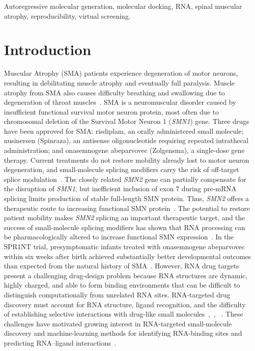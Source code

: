 \documentclass[journal]{IEEEtran}
\begin{document}
\begin{IEEEkeywords}
Autoregressive molecular generation, molecular docking, RNA, spinal
muscular atrophy, reproducibility, virtual screening.
\end{IEEEkeywords}

\section{Introduction}
 Muscular Atrophy (SMA) patients experience
degeneration of motor neurons, resulting in debilitating muscle atrophy
and eventually full paralysis. Muscle atrophy from SMA also causes
difficulty breathing and swallowing due to degeneration of throat
muscles~\cite{aslesh2022}. SMA is a neuromuscular disorder caused by
insufficient functional survival motor neuron protein, most often due to
chromosomal deletion of the Survival Motor Neuron 1 (\textit{SMN1})
gene. Three drugs have been approved for SMA: risdiplam, an orally
administered small molecule; nusinersen (Spinraza), an antisense
oligonucleotide requiring repeated intrathecal administration; and
onasemnogene abeparvovec (Zolgensma), a single-dose gene therapy.
Current treatments do not restore mobility already lost to motor neuron
degeneration, and small-molecule splicing modifiers carry the risk of
off-target splice modulation~\cite{aslesh2022}. The
closely related \textit{SMN2} gene can partially compensate for the
disruption of \textit{SMN1}, but inefficient inclusion of exon 7 during
pre-mRNA splicing limits production of stable full-length SMN protein.
Thus, \textit{SMN2} offers a therapeutic route to increasing functional
SMN protein~\cite{aslesh2022}. The potential to restore patient mobility
makes \textit{SMN2} splicing an important therapeutic target, and the
success of small-molecule splicing modifiers has shown that RNA
processing can be pharmacologically altered to increase functional SMN
expression~\cite{chong2021}. In the SPR1NT trial, presymptomatic infants
treated with onasemnogene abeparvovec within six weeks after birth
achieved substantially better developmental outcomes than expected from
the natural history of SMA~\cite{strauss2022}. However, RNA drug targets present a
challenging drug-design problem because RNA structures are dynamic,
highly charged, and able to form binding environments that can be
difficult to distinguish computationally from unrelated RNA sites.
RNA-targeted drug discovery must account for RNA structure, ligand
recognition, and the difficulty of establishing selective interactions
with drug-like small molecules~\cite{warner2018},~\cite{childs2022},%
~\cite{haga2023}. These challenges have motivated growing interest in
RNA-targeted small-molecule discovery and machine-learning methods for
identifying RNA-binding sites and predicting RNA--ligand
interactions~\cite{haga2023}.
\end{document}
